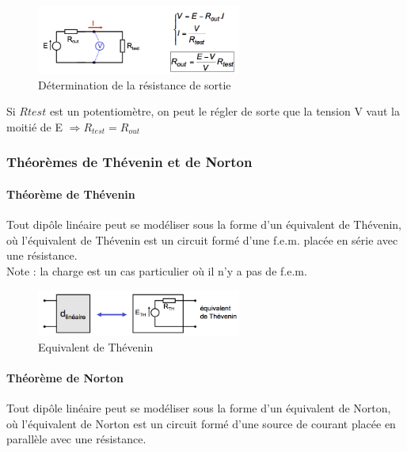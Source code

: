 \documentclass[a4paper]{article}
\begin{document}
    \begin{figure}[H]
        \begin{center}
            \includegraphics[width=0.6\textwidth]{fig/2_mesurethevenin.png}
            \caption{Détermination de la résistance de sortie}
            \label{fig:2.2.2:mesurethevenin}
        \end{center}
    \end{figure}

    Si $R{test}$ est un potentiomètre, on peut le régler de sorte que la tension
    V vaut la moitié de E $\Rightarrow R_{test} = R_{out}$

    \subsubsection{Théorèmes de Thévenin et de Norton}

    \paragraph{Théorème de Thévenin} Tout dipôle linéaire peut se modéliser
    sous la forme d'un équivalent de Thévenin, où l'équivalent de Thévenin
    est un circuit formé d'une f.e.m. placée en série avec une résistance.\\

    Note : la charge est un cas particulier où il n'y a pas de f.e.m.

    \begin{figure}[H]
        \begin{center}
            \includegraphics[width=0.6\textwidth]{fig/2_eqthevenin.png}
            \caption{Equivalent de Thévenin}
            \label{fig:2_eqthevenin}
        \end{center}
    \end{figure}

    \paragraph{Théorème de Norton} Tout dipôle linéaire peut se modéliser
    sous la forme d'un équivalent de Norton, où l'équivalent de Norton
    est un circuit formé d'une source de courant placée en parallèle avec une résistance.
\end{document}
